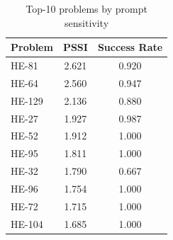 \begin{table}[t]
\centering
\caption{Top-10 problems by prompt sensitivity}
\label{tab:top_prompt_sensitivity}
\begin{tabular}{lcc}
\toprule
Problem & PSSI & Success Rate \\
\midrule
HE-81 & 2.621 & 0.920 \\
HE-64 & 2.560 & 0.947 \\
HE-129 & 2.136 & 0.880 \\
HE-27 & 1.927 & 0.987 \\
HE-52 & 1.912 & 1.000 \\
HE-95 & 1.811 & 1.000 \\
HE-32 & 1.790 & 0.667 \\
HE-96 & 1.754 & 1.000 \\
HE-72 & 1.715 & 1.000 \\
HE-104 & 1.685 & 1.000 \\
\bottomrule
\end{tabular}
\end{table}
